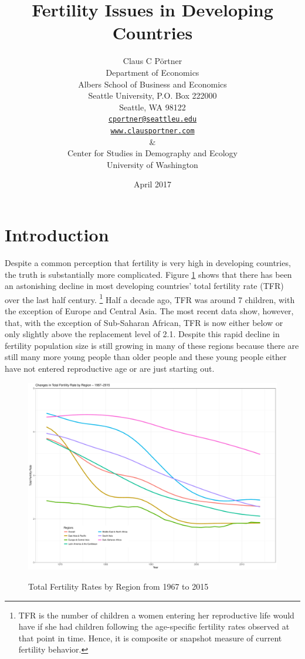 \documentclass[letterpaper,12pt]{article}
\title{Fertility Issues in Developing Countries}
\author{Claus C P\"ortner\\
    Department of Economics\\
    Albers School of Business and Economics\\
    Seattle University, P.O. Box 222000\\
    Seattle, WA 98122\\
    \href{mailto:cportner@seattleu.edu}{\texttt{cportner@seattleu.edu}}\\
    \href{http://www.clausportner.com}{\texttt{www.clausportner.com}}\\
    \& \\
    Center for Studies in Demography and Ecology \\
    University of Washington\\ \vspace{2cm}
    }
\date{April 2017}
\begin{document}
\graphicspath{{../figures/}}

\maketitle
\thispagestyle{empty}


\newpage

\section{Introduction}

Despite a common perception that fertility is very high in developing countries,
the truth is substantially more complicated.
Figure \ref{fig:TFR} shows that there has been an astonishing decline in 
most developing countries' total fertility rate (TFR) over the last half 
century.%
\footnote{
TFR is the number of children a women entering her reproductive life
would have if she had children following the age-specific fertility
rates observed at that point in time.
Hence, it is composite or snapshot measure of current fertility
behavior.
}
Half a decade ago, TFR was around 7 children, with the exception
of Europe and Central Asia.
The most recent data show, however, that, with the exception of 
Sub-Saharan African, TFR is now either below or only slightly 
above the replacement level of 2.1.
Despite this rapid decline in fertility population size is still
growing in many of these regions because there are still many
more young people than older people and these young people either
have not entered reproductive age or are just starting out.

\begin{figure}[hp]
    \centering
    \caption{Total Fertility Rates by Region from 1967 to 2015}
    \includegraphics[width=0.75\linewidth]{totalFertilityRates}
    \label{fig:TFR}
\end{figure}
\end{document}
